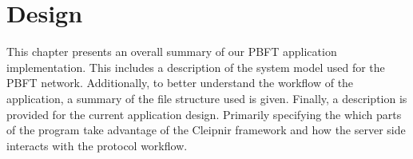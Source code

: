 \chapter{Design}
\label{chapter:Design}

This chapter presents an overall summary of our PBFT application implementation. This includes a description of the system model used for the PBFT network. Additionally, to better understand the workflow of the application, a summary of the file structure used is given. Finally, a description is provided for the current application design. Primarily specifying the which parts of the program take advantage of the Cleipnir framework and how the server side interacts with the protocol workflow.
